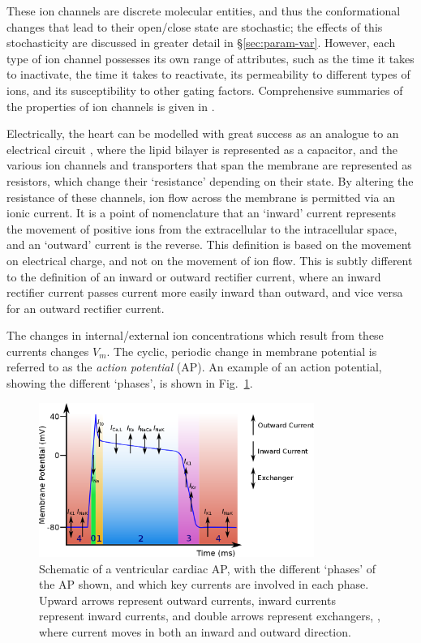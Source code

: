 \documentclass[../thesis-main.tex]{subfiles}
\begin{document}
 These ion channels are discrete molecular entities, and thus the conformational changes that lead to their open/close state are stochastic; the effects of this stochasticity are discussed in greater detail in \S\ref{sec:param-var}. However, each type of ion channel possesses its own range of attributes, such as the time it takes to inactivate, the time it takes to reactivate, its permeability to different types of ions, and its susceptibility to other gating factors. Comprehensive summaries of the properties of ion channels is given in \citet{Carmeliet2002, Roden2002}.
 
 Electrically, the heart can be modelled with great success as an analogue to an electrical circuit \citep{Carmeliet2002}, where the lipid bilayer is represented as a capacitor, and the various ion channels and transporters that span the membrane are represented as resistors, which change their `resistance' depending on their state. By altering the resistance of these channels, ion flow across the membrane is permitted via an ionic current. It is a point of nomenclature that an `inward' current represents the movement of positive ions from the extracellular to the intracellular space, and an `outward' current is the reverse. This definition is based on the movement on electrical charge, and not on the movement of ion flow. This is subtly different to the definition of an inward or outward rectifier current, where an inward rectifier current passes current more easily inward than outward, and vice versa for an outward rectifier current.
 
 The changes in internal/external ion concentrations which result from these currents changes $V_m$. The cyclic, periodic change in membrane potential is referred to as the \emph{action potential} (AP). An example of an action potential, showing the different `phases', is shown in Fig.~\ref{fig:ap-structure}. 
 \begin{figure}
  \centering
  \includegraphics[width=0.8\textwidth]{ap-structure-full}
  \caption[Schematic of a cardiac AP]{Schematic of a ventricular cardiac AP, with the different `phases' of the AP shown, and which key currents are involved in each phase. Upward arrows represent outward currents, inward currents represent inward currents, and double arrows represent exchangers, \idest, where current moves in both an inward and outward direction.}
  \label{fig:ap-structure}
 \end{figure}
 
\end{document}
